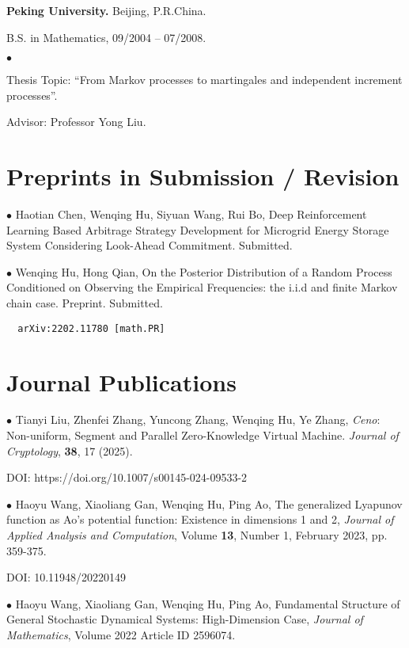 \documentclass[margin,line]{res}
\newenvironment{list2}{
  \begin{list}{$\bullet$}{%
      \setlength{\itemsep}{0in}
      \setlength{\parsep}{0in} \setlength{\parskip}{0in}
      \setlength{\topsep}{0in} \setlength{\partopsep}{0in}
      \setlength{\leftmargin}{0.2in}}}{\end{list}}
\begin{document}
\begin{resume}
{\bf Peking University.} \hfill Beijing, P.R.China. \\
\vspace*{-.25in}

B.S. in Mathematics, \hfill 09/2004 -- 07/2008.

\begin{list2}
\vspace*{.05in}
\item[] Thesis Topic: ``From Markov processes to martingales and independent
increment processes''.
\item[] Advisor: Professor Yong Liu.
\end{list2}



\section{\sc Preprints in Submission /  Revision}

$\bullet$ Haotian Chen, Wenqing Hu, Siyuan Wang, Rui Bo, Deep Reinforcement Learning Based Arbitrage Strategy Development for Microgrid Energy Storage System Considering Look-Ahead Commitment. Submitted.

$\bullet$ Wenqing Hu, Hong Qian, On the Posterior Distribution of a Random Process Conditioned on Observing the Empirical Frequencies: the i.i.d and finite Markov chain case. Preprint. Submitted.

\verb"	arXiv:2202.11780 [math.PR]"


\section{\sc Journal Publications}

$\bullet$ Tianyi Liu, Zhenfei Zhang, Yuncong Zhang, Wenqing Hu, Ye Zhang, \textit{Ceno}: Non-uniform, Segment and Parallel Zero-Knowledge Virtual Machine. \textit{Journal of Cryptology}, \textbf{38}, 17 (2025). 

DOI: https://doi.org/10.1007/s00145-024-09533-2

$\bullet$ Haoyu Wang, Xiaoliang Gan, Wenqing Hu, Ping Ao, The generalized Lyapunov function as Ao's potential function: Existence in dimensions 1 and 2, \textit{Journal of Applied Analysis and Computation}, Volume \textbf{13}, Number 1, February 2023, pp. 359-375. 

DOI: 10.11948/20220149

$\bullet$ Haoyu Wang, Xiaoliang Gan, Wenqing Hu, Ping Ao,  Fundamental Structure of General Stochastic Dynamical Systems: High-Dimension Case, \textit{Journal of Mathematics}, Volume 2022 Article ID 2596074.


\end{resume}
\end{document}
